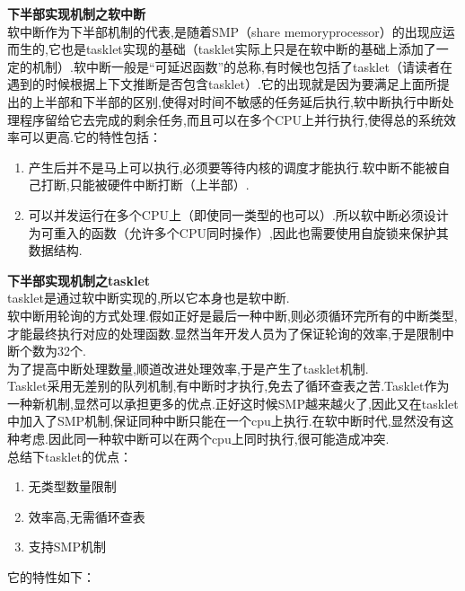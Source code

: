 \documentclass[a4paper,12pt,notitlepage]{article}
\begin{document}
	\textbf{下半部实现机制之软中断} \\

	软中断作为下半部机制的代表,是随着SMP（share memoryprocessor）的出现应运而生的,它也是tasklet实现的基础（tasklet实际上只是在软中断的基础上添加了一定的机制）.软中断一般是“可延迟函数”的总称,有时候也包括了tasklet（请读者在遇到的时候根据上下文推断是否包含tasklet）.它的出现就是因为要满足上面所提出的上半部和下半部的区别,使得对时间不敏感的任务延后执行,软中断执行中断处理程序留给它去完成的剩余任务,而且可以在多个CPU上并行执行,使得总的系统效率可以更高.它的特性包括： \\
	
\begin{enumerate}
	\item 产生后并不是马上可以执行,必须要等待内核的调度才能执行.软中断不能被自己打断,只能被硬件中断打断（上半部）.
	\item 可以并发运行在多个CPU上（即使同一类型的也可以）.所以软中断必须设计为可重入的函数（允许多个CPU同时操作）,因此也需要使用自旋锁来保护其数据结构.
\end{enumerate}
 
	\textbf{下半部实现机制之tasklet} \\

	tasklet是通过软中断实现的,所以它本身也是软中断. \\

	软中断用轮询的方式处理.假如正好是最后一种中断,则必须循环完所有的中断类型,才能最终执行对应的处理函数.显然当年开发人员为了保证轮询的效率,于是限制中断个数为32个. \\

	为了提高中断处理数量,顺道改进处理效率,于是产生了tasklet机制. \\

	Tasklet采用无差别的队列机制,有中断时才执行,免去了循环查表之苦.Tasklet作为一种新机制,显然可以承担更多的优点.正好这时候SMP越来越火了,因此又在tasklet中加入了SMP机制,保证同种中断只能在一个cpu上执行.在软中断时代,显然没有这种考虑.因此同一种软中断可以在两个cpu上同时执行,很可能造成冲突. \\

	总结下tasklet的优点：

\begin{enumerate}
	\item 无类型数量限制
	\item 效率高,无需循环查表
	\item 	支持SMP机制
\end{enumerate}
	
	它的特性如下： 
\end{document}
